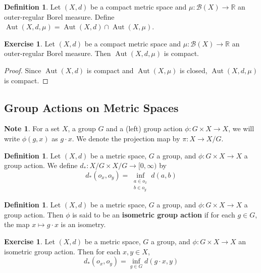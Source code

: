 \documentclass[12pt]{amsart}
\theoremstyle{definition}
\newtheorem{defn}[definition]{Definition}
\newtheorem{note}[definition]{Note}
\newtheorem{ex}[definition]{Exercise}
\newcommand{\R}{\mathbb{R}}
\newcommand{\MB}{\mathcal{B}}
\newcommand{\Rg}{[0,\infty)}
\DeclareMathOperator{\Aut}{Aut}
\begin{document}
	\begin{defn}
	Let $(X,d)$ be a compact metric space and $\mu: \MB(X) \rightarrow \R$ an outer-regular Borel measure. Define $\Aut(X, d, \mu) = \Aut(X, d) \cap \Aut(X, \mu)$.
	\end{defn}
	
	\begin{ex}
	Let $(X,d)$ be a compact metric space and $\mu: \MB(X) \rightarrow \R$ an outer-regular Borel measure. Then $\Aut(X, d, \mu)$ is compact.
	\end{ex}
	
	\begin{proof}
	Since $\Aut(X, d)$ is compact and $\Aut(X, \mu)$ is closed, $\Aut(X, d, \mu)$ is compact.
	\end{proof}
	
	
	
	
	
	
	
	
	
	
	
	\newpage
	\subsection{Group Actions on Metric Spaces}
	
	\begin{note}
	For a set $X$, a group $G$ and a (left) group action $\phi: G \times X \rightarrow X$, we will write $\phi(g, x)$ as $g \cdot x$. We denote the projection map by $\pi: X \rightarrow X/G$.
	\end{note}	
	
	\begin{defn}
	Let $(X, d)$ be a metric space, $G$ a group, and $\phi: G \times X \rightarrow X$ a group action. We define 
	$d_*: X/G \times X / G \rightarrow \Rg$ by 
	$$d_*(o_x, o_y) = \inf_{\substack{a \in o_x \\ b \in o_y}} d(a,b) $$
	\end{defn}
	
	\begin{defn}
	Let $(X, d)$ be a metric space, $G$ a group, and $\phi: G \times X \rightarrow X$ a group action. Then $\phi$ is said to be an \textbf{isometric group action} if for each $g \in G$, the map $x \mapsto g \cdot x$ is an isometry. 
	\end{defn}
	
	\begin{ex}
	Let $(X, d)$ be a metric space, $G$ a group, and $\phi: G \times X \rightarrow X$ an isometric group action. Then for each $x, y \in X$, $$d_*(o_x, o_y) = \inf_{g \in G} d(g \cdot x, y)$$
	\end{ex}
	
\end{document}
